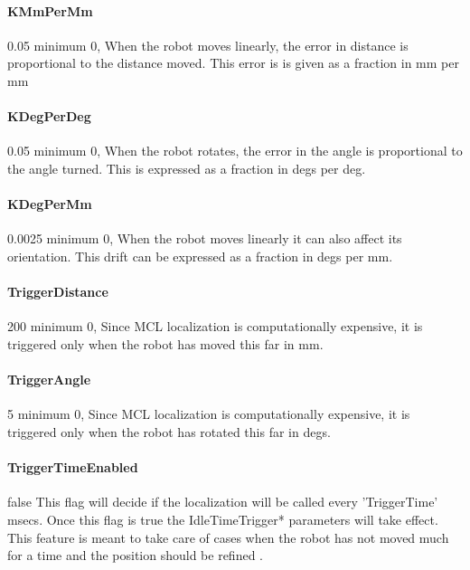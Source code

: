 \documentclass{article}
\begin{document}
\paragraph{KMmPerMm} 0.05             minimum 0,  When the robot moves linearly, the error
                          in distance is proportional to the distance moved.
                          This error is is given as a fraction in mm per mm

\paragraph{KDegPerDeg}\label{KDegPerDegDoc} 0.05           minimum 0,  When the robot rotates, the error in the
                          angle is proportional to the angle turned. This is
                          expressed as a fraction in degs per deg.

\paragraph{KDegPerMm} 0.0025          minimum 0,  When the robot moves linearly it can
                          also affect its orientation. This drift can be
                          expressed as a fraction in degs per mm.

\paragraph{TriggerDistance} 200       minimum 0,  Since MCL localization is
                          computationally expensive, it is triggered only when
                          the robot has moved this far in mm.

\paragraph{TriggerAngle} 5            minimum 0,  Since MCL localization is
                          computationally expensive, it is triggered only when
                          the robot has rotated this far in degs.

\paragraph{TriggerTimeEnabled} false  This flag will decide if the localization will be
                          called every 'TriggerTime' msecs. Once this flag is
                          true the IdleTimeTrigger* parameters will take
                          effect. This feature is meant to take care of cases
                          when the robot has not moved much for a time and the
                          position should be refined .
\end{document}
